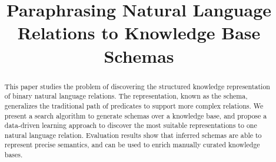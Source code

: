 \documentclass[letterpaper]{article}
\begin{document}
%
\title{Paraphrasing Natural Language Relations to Knowledge Base Schemas}
\author{
}
\maketitle
\begin{abstract}
This paper studies the problem of discovering the structured knowledge representation of binary natural language relations.
The representation, known as the schema, generalizes the traditional path of predicates to support more complex relations.
We present a search algorithm to generate schemas over a knowledge base, and propose a data-driven learning approach to discover the most suitable representations to one natural language relation.
Evaluation results show that inferred schemas are able to represent precise semantics, and can be used to enrich manually curated knowledge bases. 


\end{abstract}











%








\end{document}
